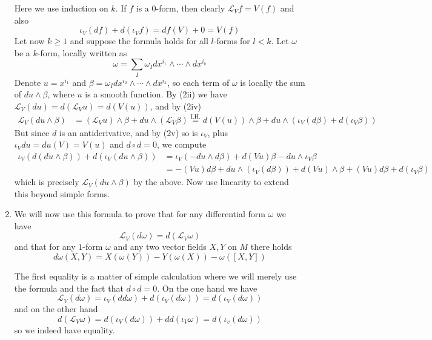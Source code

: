 \documentclass[a4paper, 12pt]{article}
\begin{document}
\begin{Exercise}
\begin{enumerate}[label=(\roman*)]
            Here we use induction on $k$.
            If $f$ is a $0$-form, then clearly $\mathcal{L}_Vf = V(f)$ and also
            \[
                \iota_V(df) + d(\iota_Vf) = df(V) + 0 = V(f)
            \]
            Let now $k \geq 1$ and suppose the formula holds for all $l$-forms for $l<k$.
            Let $\omega$ be a $k$-form, locally written as
            \[
                \omega = \sum_{I} \omega_I dx^{i_1}\wedge\cdots\wedge dx^{i_k}
            \]
            Denote $u = x^{i_1}$ and $\beta = \omega_I dx^{i_2}\wedge\cdots\wedge dx^{i_k}$,
            so each term of $\omega$ is locally the sum of $du \wedge \beta$, where $u$ is a smooth function.
            By (2ii) we have $\mathcal{L}_V(du) = d(\mathcal{L}_Vu) = d(V(u))$, and by (2iv)
            \begin{align*}
                \mathcal{L}_V(du \wedge \beta)
                &= (\mathcal{L}_Vu)\wedge\beta + du\wedge(\mathcal{L}_V\beta)
                \overset{\text{I.H.}}{=} d(V(u))\wedge\beta + du \wedge (\iota_V(d\beta) + d(\iota_V\beta))
            \end{align*}
            But since $d$ is an antiderivative, and by (2v) so is $\iota_V$, plus $\iota_Vdu = du(V) = V(u)$ and $d\circ d = 0$,
            we compute
            \begin{align*}
                \iota_V(d(du \wedge \beta)) + d(\iota_V(du\wedge\beta))
                &= \iota_V(-du \wedge d\beta) + d(Vu)\beta - du \wedge \iota_V\beta \\
                &= -(Vu)d\beta + du \wedge (\iota_V(d\beta)) + d(Vu) \wedge \beta + (Vu)d\beta + d(\iota_V\beta)
            \end{align*}
            which is precisely $\mathcal{L}_V(du \wedge \beta)$ by the above.
            Now use linearity to extend this beyond simple forms.
        \item We will now use this formula to prove that for any differential form $\omega$ we have
            \[
                \mathcal{L}_V(d\omega) = d(\mathcal{L}_V\omega)
            \]
            and that for any $1$-form $\omega$ and any two vector fields $X,Y$ on $M$ there holds
            \[
                d\omega(X, Y) = X(\omega(Y)) - Y(\omega(X)) - \omega([X, Y])
            \]

            The first equality is a matter of simple calculation where we will merely use the formula and the fact that $d \circ d = 0$.
            On the one hand we have
            \[
                \mathcal{L}_V(d\omega) = \iota_V(dd\omega) + d(\iota_V(d\omega)) = d(\iota_V(d\omega)) 
            \]
            and on the other hand
            \[
                d(\mathcal{L}_V\omega) = d(\iota_V(d\omega)) + dd(\iota_V\omega) = d(\iota_v(d\omega))
            \]
            so we indeed have equality.


\end{enumerate}
\end{Exercise}
\end{document}
